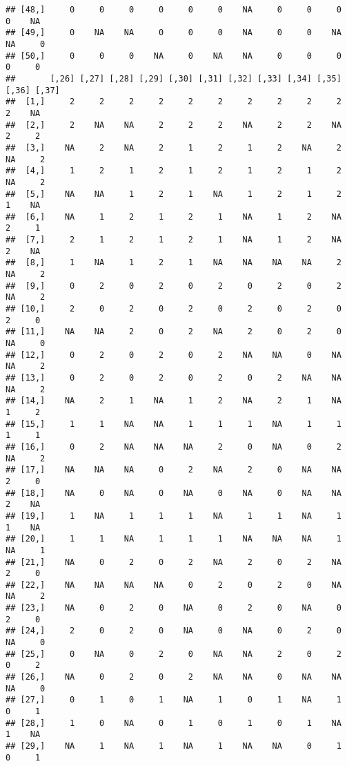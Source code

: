 \documentclass[
]{article}
\begin{document}
\begin{verbatim}
## [48,]     0     0     0     0     0     0    NA     0     0     0     0    NA
## [49,]     0    NA    NA     0     0     0    NA     0     0    NA    NA     0
## [50,]     0     0     0    NA     0    NA    NA     0     0     0     0     0
##       [,26] [,27] [,28] [,29] [,30] [,31] [,32] [,33] [,34] [,35] [,36] [,37]
##  [1,]     2     2     2     2     2     2     2     2     2     2     2    NA
##  [2,]     2    NA    NA     2     2     2    NA     2     2    NA     2     2
##  [3,]    NA     2    NA     2     1     2     1     2    NA     2    NA     2
##  [4,]     1     2     1     2     1     2     1     2     1     2    NA     2
##  [5,]    NA    NA     1     2     1    NA     1     2     1     2     1    NA
##  [6,]    NA     1     2     1     2     1    NA     1     2    NA     2     1
##  [7,]     2     1     2     1     2     1    NA     1     2    NA     2    NA
##  [8,]     1    NA     1     2     1    NA    NA    NA    NA     2    NA     2
##  [9,]     0     2     0     2     0     2     0     2     0     2    NA     2
## [10,]     2     0     2     0     2     0     2     0     2     0     2     0
## [11,]    NA    NA     2     0     2    NA     2     0     2     0    NA     0
## [12,]     0     2     0     2     0     2    NA    NA     0    NA    NA     2
## [13,]     0     2     0     2     0     2     0     2    NA    NA    NA     2
## [14,]    NA     2     1    NA     1     2    NA     2     1    NA     1     2
## [15,]     1     1    NA    NA     1     1     1    NA     1     1     1     1
## [16,]     0     2    NA    NA    NA     2     0    NA     0     2    NA     2
## [17,]    NA    NA    NA     0     2    NA     2     0    NA    NA     2     0
## [18,]    NA     0    NA     0    NA     0    NA     0    NA    NA     2    NA
## [19,]     1    NA     1     1     1    NA     1     1    NA     1     1    NA
## [20,]     1     1    NA     1     1     1    NA    NA    NA     1    NA     1
## [21,]    NA     0     2     0     2    NA     2     0     2    NA     2     0
## [22,]    NA    NA    NA    NA     0     2     0     2     0    NA    NA     2
## [23,]    NA     0     2     0    NA     0     2     0    NA     0     2     0
## [24,]     2     0     2     0    NA     0    NA     0     2     0    NA     0
## [25,]     0    NA     0     2     0    NA    NA     2     0     2     0     2
## [26,]    NA     0     2     0     2    NA    NA     0    NA    NA    NA     0
## [27,]     0     1     0     1    NA     1     0     1    NA     1     0     1
## [28,]     1     0    NA     0     1     0     1     0     1    NA     1    NA
## [29,]    NA     1    NA     1    NA     1    NA    NA     0     1     0     1

\end{verbatim}
\end{document}
